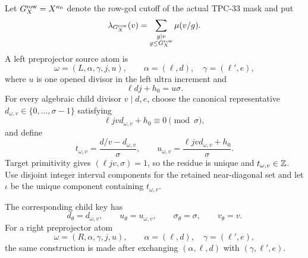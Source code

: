Let \(G_X^{\rm row}=X^{\kappa_0}\) denote the row-gcd cutoff of the
actual TPC-33 mask and put
\[
 \lambda_{G_X^{\rm row}}(v)
 =
 \sum_{\substack{g\mid v\\g\le G_X^{\rm row}}}\mu(v/g).
\]
A left preprojector source atom is
\begin{equation}
 \omega=(L,\alpha,\gamma,j,u),\qquad
 \alpha=(\ell,d),\quad\gamma=(\ell',e),
\label{eq:source-left-atom}
\end{equation}
where \(u\) is one opened divisor in the left ultra increment and
\[
 \ell dj+h_0=u\sigma.
\]
For every algebraic child divisor \(v\mid d,e\), choose the canonical
representative \(d_{\omega,v}\in\{0,\ldots,\sigma-1\}\) satisfying
\begin{equation}
 \ell jv d_{\omega,v}+h_0\equiv0\pmod{\sigma},
\label{eq:source-canonical-residue}
\end{equation}
and define
\begin{equation}
 t_{\omega,v}
 =
 \frac{d/v-d_{\omega,v}}{\sigma},
 \qquad
 u_{\omega,v}
 =
 \frac{\ell jv d_{\omega,v}+h_0}{\sigma}.
\label{eq:source-to-child}
\end{equation}
Target primitivity gives \((\ell jv,\sigma)=1\), so the residue is
unique and \(t_{\omega,v}\in\mathbb Z\).  Use disjoint integer interval
components for the retained near-diagonal set and let \(\iota\) be
the unique component containing \(t_{\omega,v}\).

The corresponding child key has
\[
 d_\theta=d_{\omega,v},\qquad
 u_\theta=u_{\omega,v},\qquad
 \sigma_\theta=\sigma,\qquad v_\theta=v.
\]
For a right preprojector atom
\[
 \omega=(R,\alpha,\gamma,j,u),\qquad
 \alpha=(\ell,d),\quad\gamma=(\ell',e),
\]
the same construction is made after exchanging
\((\alpha,\ell,d)\) with \((\gamma,\ell',e)\).

